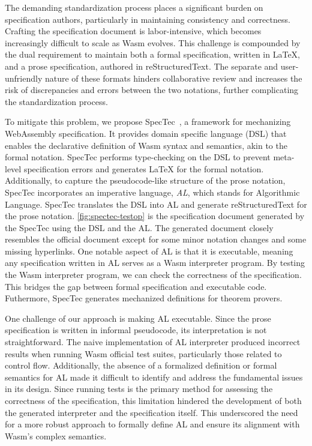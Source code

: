 The demanding standardization process places a significant burden on
specification authors, particularly in maintaining consistency and correctness.
Crafting the specification document is labor-intensive, which becomes
increasingly difficult to scale as Wasm evolves.
This challenge is compounded by the dual requirement to maintain both a formal
specification, written in LaTeX, and a prose specification, authored in
reStructuredText.
The separate and user-unfriendly nature of these formats hinders collaborative
review and increases the risk of discrepancies and errors between the two
notations, further complicating the standardization process.


To mitigate this problem, we propose SpecTec~\cite{spectec}, a framework for
mechanizing WebAssembly specification.
It provides domain specific language (DSL) that enables the declarative
definition of Wasm syntax and semantics, akin to the formal notation.
SpecTec performs type-checking on the DSL to prevent meta-level specification
errors and generates LaTeX for the formal notation.
Additionally, to capture the pseudocode-like structure of the prose notation,
SpecTec incorporates an imperative language, \textit{AL}, which stands for
Algorithmic Language.
SpecTec translates the DSL into AL and generate reStructuredText for the prose
notation.
\cref{fig:spectec-testop} is the specification document generated by the
SpecTec using the DSL and the AL.
The generated document closely resembles the official document except for some
minor notation changes and some missing hyperlinks.
One notable aspect of AL is that it is executable, meaning any specification
written in AL serves as a Wasm interpreter program.
By testing the Wasm interpreter program, we can check the correctness of the
specification.
This bridges the gap between formal specification and executable code.
Futhermore, SpecTec generates mechanized definitions for theorem provers.


One challenge of our approach is making AL executable.
Since the prose specification is written in informal pseudocode, its
interpretation is not straightforward.
The naive implementation of AL interpreter produced incorrect results when
running Wasm official test suites, particularly those related to control flow.
Additionally, the absence of a formalized definition or formal semantics for AL
made it difficult to identify and address the fundamental issues in its design.
Since running tests is the primary method for assessing the correctness of the
specification, this limitation hindered the development of both the generated
interpreter and the specification itself.
This underscored the need for a more robust approach to formally define AL and
ensure its alignment with Wasm's complex semantics.


